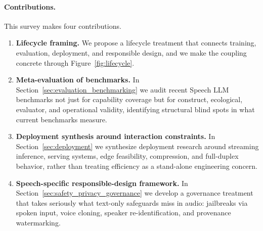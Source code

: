 \paragraph{Contributions.}
This survey makes four contributions.
\begin{enumerate}
  \item \textbf{Lifecycle framing.} We propose a lifecycle treatment
    that connects training, evaluation, deployment, and responsible
    design, and we make the coupling concrete through
    Figure~\ref{fig:lifecycle}.
  \item \textbf{Meta-evaluation of benchmarks.} In
    Section~\ref{sec:evaluation_benchmarking} we audit recent Speech
    LLM benchmarks not just for capability coverage but for construct,
    ecological, evaluator, and operational validity, identifying
    structural blind spots in what current benchmarks measure.
  \item \textbf{Deployment synthesis around interaction constraints.}
    In Section~\ref{sec:deployment} we synthesize deployment research
    around streaming inference, serving systems, edge feasibility,
    compression, and full-duplex behavior, rather than treating
    efficiency as a stand-alone engineering concern.
  \item \textbf{Speech-specific responsible-design framework.} In
    Section~\ref{sec:safety_privacy_governance} we develop a
    governance treatment that takes seriously what text-only
    safeguards miss in audio: jailbreaks via spoken input, voice
    cloning, speaker re-identification, and provenance watermarking.
\end{enumerate}

